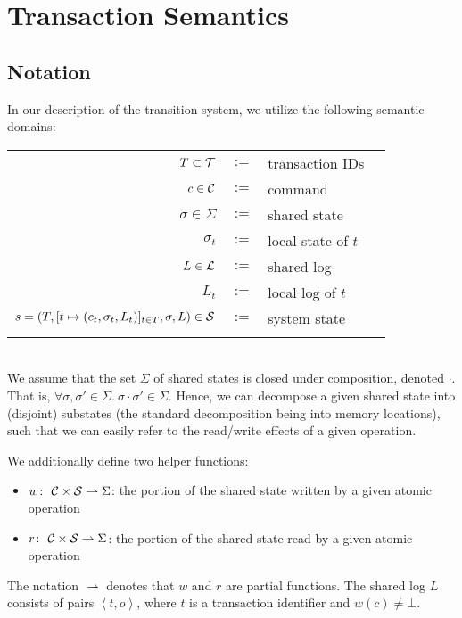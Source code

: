 \section{Transaction Semantics}
\label{sec:concretesemantics}
\subsection{Notation}

In our description of the transition system, we utilize the following semantic domains:
\\
\begin{tabular}{rcll}
	\\
	$T \subset {\cal T}$ & $:=$ & transaction IDs \\
	$c \in {\cal C}$ & $:=$ & command \\
	$\sigma \in \Sigma$ & $:=$ & shared state \\
	${\sigma_t}$ & $:=$ & local state of $t$ \\
	$L \in {\cal L}$ & $:=$ & shared log \\
	$L_t$ & $:=$ & local log of $t$ \\
	$s = (T, [t \mapsto (c_t,\sigma_t,L_t)]_{t \in T}, \sigma, L) \in {\cal S}$ & $:=$ & system state \\
	\\
\end{tabular}
\\
We assume that the set $\Sigma$ of shared states is closed under composition, denoted $\cdot$. That is,
$\forall \sigma,\sigma' \in \Sigma.\ \sigma \cdot \sigma' \in \Sigma$. Hence, we can decompose a given shared state into (disjoint) substates (the standard decomposition being into memory locations), such that we can easily refer to the read/write effects of a given operation.

We additionally define two helper functions:
\begin{itemize}
\item $w \colon\ {\cal C} \times {\cal S} \rightharpoonup \Sigma$: the portion of the shared state written by a given atomic operation
\item $r \colon\ {\cal C} \times {\cal S} \rightharpoonup \Sigma$: the portion of the shared state read by a given atomic operation
\end{itemize}
The notation $\rightharpoonup$ denotes that $w$ and $r$ are partial functions. The shared log $L$ consists of pairs $\left\langle t,o \right\rangle$, where $t$ is a transaction identifier and $w(c) \neq \bot$.

